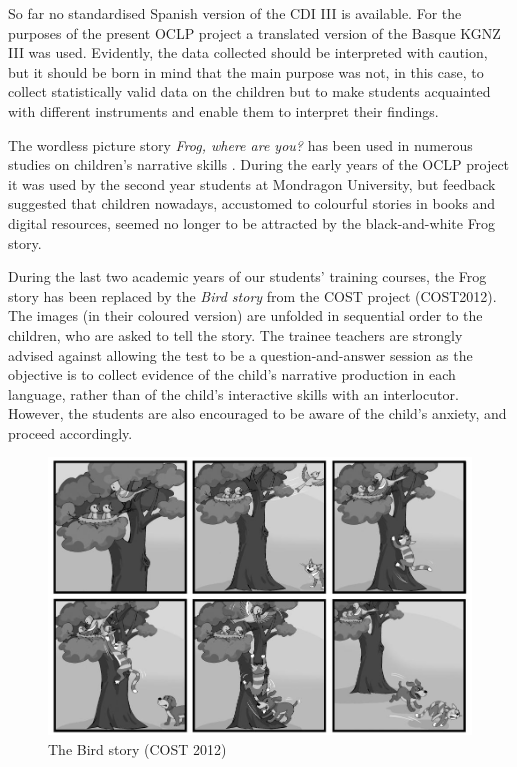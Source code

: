 \documentclass[output=paper]{../langscibook}
\begin{document}
So far no standardised Spanish version of the CDI III is available. For the purposes of the present OCLP project a translated version of the Basque KGNZ III was used. Evidently, the data collected should be interpreted with caution, but it should be born in mind that the main purpose was not, in this case, to collect statistically valid data on the children but to make students acquainted with different instruments and enable them to interpret their findings.

The wordless picture story \emph{Frog, where are you?} \citep{Mayer1969} has been used in numerous studies on children’s narrative skills \citep{BermanSlobin1994,StromquistVerhoeven2004}. During the early years of the OCLP project it was used by the second year students at Mondragon University, but feedback suggested that children nowadays, accustomed to colourful stories in books and digital resources, seemed no longer to be attracted by the black-and-white Frog story.

During the last two academic years of our students’ training courses, the Frog story has been replaced by the \emph{Bird story} from the COST project (COST2012). The images (in their coloured version) are unfolded in sequential order to the children, who are asked to tell the story. The trainee teachers are strongly advised against allowing the test to be a question-and-answer session as the objective is to collect evidence of the child's narrative production in each language, rather than of the child's interactive skills with an interlocutor. However, the students are also encouraged to be aware of the child's anxiety, and proceed accordingly.

\begin{figure}
  \includegraphics[width=\textwidth]{figures/Chapter6-img001.png}
  \caption{The Bird story (COST 2012)}
\end{figure}
\end{document}
